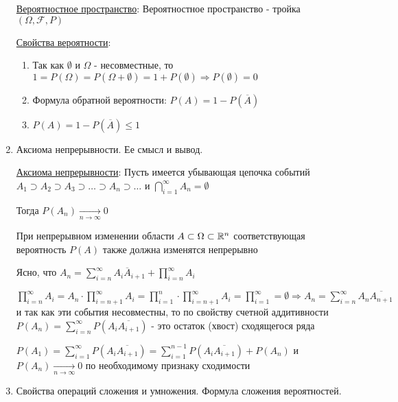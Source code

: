 \documentclass[12pt]{article}
\begin{document}
\begin{enumerate}
    \hyperlink{probabilityspace}{Вероятностное пространство}: Вероятностное пространство - тройка $(\Omega, \mathcal{F}, P)$

    \hyperlink{probabilityproperties}{Свойства вероятности}: 

    \begin{enumerate}
        \item Так как $\emptyset$ и $\Omega$ - несовместные, то $1 = P(\Omega) = P(\Omega + \emptyset) = 1 + P(\emptyset) \Longrightarrow P(\emptyset) = 0$

        \item Формула обратной вероятности: $P(A) = 1 - P(\overline{A})$

        \item $P(A) = 1 - P(\overline{A}) \leq 1$
    \end{enumerate}

    \item Аксиома непрерывности. Ее смысл и вывод.

    \hyperlink{continuityaxiom}{Аксиома непрерывности}: \Ths Пусть имеется убывающая цепочка событий $A_1 \supset A_2 \supset A_3 \supset \dots \supset A_n \supset \dots$ и $\bigcap_{i = 1}^\infty A_n = \emptyset$

    Тогда $P(A_n) \underset{n \to \infty}{\to} 0$

    При непрерывном изменении области $A \subset \Omega \subset \mathbb{R}^n$ соответствующая вероятность $P(A)$ также должна изменятся непрерывно

    \begin{MyProof}
        Ясно, что $A_n = \sum_{i = n}^\infty A_i \overline{A}_{i + 1} + \prod_{i = n}^\infty A_i$

        $\prod_{i = n}^\infty A_i = A_n \cdot \prod_{i = n + 1}^\infty A_i = \prod_{i = 1}^n
        \cdot \prod_{i = n + 1}^\infty A_i = \prod_{i = 1}^\infty = \emptyset \Longrightarrow
        A_n = \sum_{i = n}^\infty A_n \overline{A_{n + 1}}$ и так как эти события несовместны,
        то по свойству счетной аддитивности $P(A_n) = \sum_{i = n}^\infty P(A_i \overline{A_{i + 1}})$ - это остаток (хвост) сходящегося ряда

        $P(A_1) = \sum_{i = 1}^\infty P(A_i \overline{A_{i + 1}}) = \sum_{i = 1}^{n - 1} P(A_i \overline{A_{i + 1}}) + P(A_n)$ и $P(A_n) \underset{n \to \infty}{\to} 0$ по необходимому признаку сходимости
    \end{MyProof}

    \item Свойства операций сложения и умножения. Формула сложения вероятностей.


\end{enumerate}
\end{document}
